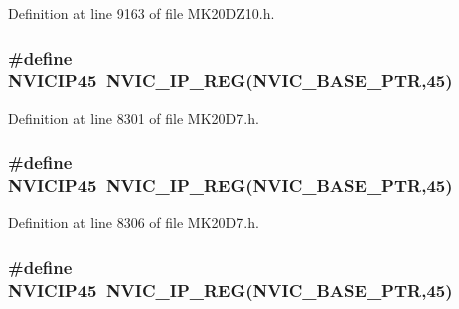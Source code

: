 Definition at line 9163 of file M\+K20\+D\+Z10.\+h.

\subsubsection[{\texorpdfstring{N\+V\+I\+C\+I\+P45}{NVICIP45}}]{\setlength{\rightskip}{0pt plus 5cm}\#define N\+V\+I\+C\+I\+P45~{\bf N\+V\+I\+C\+\_\+\+I\+P\+\_\+\+R\+EG}({\bf N\+V\+I\+C\+\_\+\+B\+A\+S\+E\+\_\+\+P\+TR},45)}\hypertarget{group___n_v_i_c___register___accessor___macros_gadf17ddcd12922e40ea0958611b89490a}{}\label{group___n_v_i_c___register___accessor___macros_gadf17ddcd12922e40ea0958611b89490a}


Definition at line 8301 of file M\+K20\+D7.\+h.

\subsubsection[{\texorpdfstring{N\+V\+I\+C\+I\+P45}{NVICIP45}}]{\setlength{\rightskip}{0pt plus 5cm}\#define N\+V\+I\+C\+I\+P45~{\bf N\+V\+I\+C\+\_\+\+I\+P\+\_\+\+R\+EG}({\bf N\+V\+I\+C\+\_\+\+B\+A\+S\+E\+\_\+\+P\+TR},45)}\hypertarget{group___n_v_i_c___register___accessor___macros_gadf17ddcd12922e40ea0958611b89490a}{}\label{group___n_v_i_c___register___accessor___macros_gadf17ddcd12922e40ea0958611b89490a}


Definition at line 8306 of file M\+K20\+D7.\+h.

\subsubsection[{\texorpdfstring{N\+V\+I\+C\+I\+P45}{NVICIP45}}]{\setlength{\rightskip}{0pt plus 5cm}\#define N\+V\+I\+C\+I\+P45~{\bf N\+V\+I\+C\+\_\+\+I\+P\+\_\+\+R\+EG}({\bf N\+V\+I\+C\+\_\+\+B\+A\+S\+E\+\_\+\+P\+TR},45)}\hypertarget{group___n_v_i_c___register___accessor___macros_gadf17ddcd12922e40ea0958611b89490a}{}\label{group___n_v_i_c___register___accessor___macros_gadf17ddcd12922e40ea0958611b89490a}



